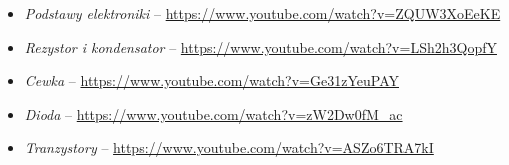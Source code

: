 % 
% 
% 
% 

\begin{itemize}
\item \emph{Podstawy elektroniki} – \url{https://www.youtube.com/watch?v=ZQUW3XoEeKE}
\item \emph{Rezystor i  kondensator} – \url{https://www.youtube.com/watch?v=LSh2h3QopfY}
\item \emph{Cewka} – \url{https://www.youtube.com/watch?v=Ge31zYeuPAY}
\item \emph{Dioda} – \url{https://www.youtube.com/watch?v=zW2Dw0fM_ac}
\item \emph{Tranzystory} – \url{https://www.youtube.com/watch?v=ASZo6TRA7kI}
\end{itemize}
